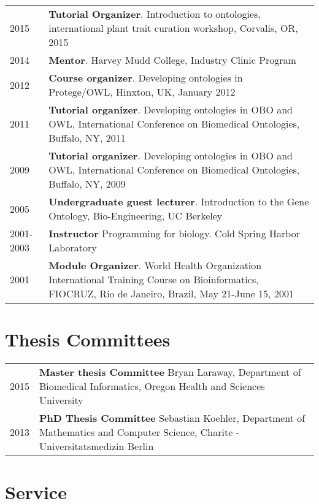 \documentclass[11pt,fullpage]{article}
\begin{document}
\begin{longtable}{p{0.5in}|p{5.5in}}
  2015 &  \textbf{Tutorial Organizer}. Introduction to ontologies, international plant trait curation workshop, Corvalis, OR, 2015  \\
  2014 &  \textbf{Mentor}. Harvey Mudd College, Industry Clinic Program \\
  2012 &  \textbf{Course organizer}. Developing ontologies in Protege/OWL, Hinxton, UK, January 2012 \\
  2011 &  \textbf{Tutorial organizer}. Developing ontologies in OBO and OWL, International Conference on Biomedical Ontologies, Buffalo, NY, 2011 \\
  2009 &  \textbf{Tutorial organizer}. Developing ontologies in OBO and OWL, International Conference on Biomedical Ontologies, Buffalo, NY, 2009 \\
  2005 &  \textbf{Undergraduate guest lecturer}. Introduction to the Gene Ontology, Bio-Engineering, UC Berkeley \\
  2001-2003 &  \textbf{Instructor} Programming for biology. Cold Spring Harbor Laboratory\\
  2001 &  \textbf{Module Organizer}. World Health Organization International Training Course on Bioinformatics, FIOCRUZ, Rio de Janeiro, Brazil, May 21-June 15, 2001 \\
\end{longtable}

\section*{Thesis Committees}

\begin{longtable}{p{0.5in}|p{5.5in}}
 2015 & \textbf{Master thesis Committee} Bryan Laraway, Department of Biomedical Informatics, Oregon Health and Sciences University \\
 2013 & \textbf{PhD Thesis Committee} Sebastian Koehler, Department of Mathematics and Computer Science, Charite - Universitatsmedizin Berlin \\
\end{longtable}

\section*{Service}

\end{document}
